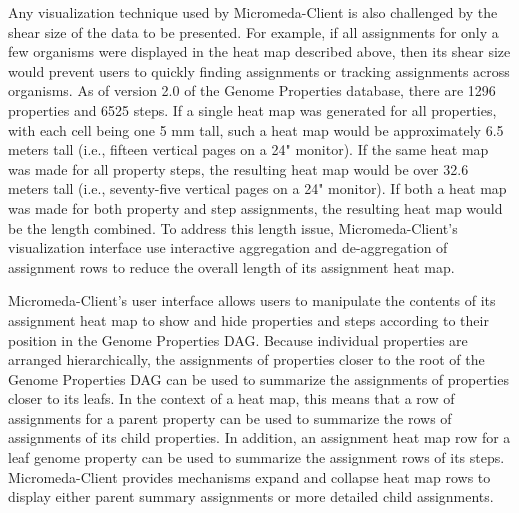Any visualization technique used by Micromeda-Client is also challenged by the shear size of the data to be presented. For example, if all assignments for only a few organisms were displayed in the heat map described above, then its shear size would prevent users to quickly finding assignments or tracking assignments across organisms. As of version 2.0 of the Genome Properties database, there are 1296 properties and 6525 steps. If a single heat map was generated for all properties, with each cell being one 5 mm tall, such a heat map would be approximately 6.5 meters tall (i.e., fifteen vertical pages on a 24" monitor). If the same heat map was made for all property steps, the resulting heat map would be over 32.6 meters tall (i.e., seventy-five vertical pages on a 24" monitor). If both a heat map was made for both property and step assignments, the resulting heat map would be the length combined. To address this length issue, Micromeda-Client's visualization interface use interactive aggregation and de-aggregation of assignment rows to reduce the overall length of its assignment heat map.

Micromeda-Client's user interface allows users to manipulate the contents of its assignment heat map to show and hide properties and steps according to their position in the Genome Properties DAG. Because individual properties are arranged hierarchically, the assignments of properties closer to the root of the Genome Properties DAG can be used to summarize the assignments of properties closer to its leafs. In the context of a heat map, this means that a row of assignments for a parent property can be used to summarize the rows of assignments of its child properties. In addition, an assignment heat map row for a leaf genome property can be used to summarize the assignment rows of its steps. Micromeda-Client provides mechanisms expand and collapse heat map rows to display either parent summary assignments or more detailed child assignments.

